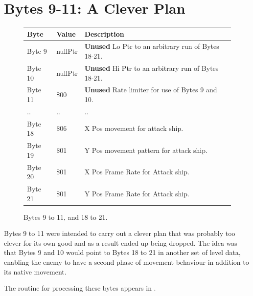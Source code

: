 \section{Bytes 9-11: A Clever Plan}
\begin{figure}[H]

  {
    \setlength{\tabcolsep}{3.0pt}
    \setlength\cmidrulewidth{\heavyrulewidth} %
    \begin{adjustbox}{width=13cm}

      \begin{tabular}{lll}
        \toprule
        Byte    & Value                     & Description                                                        \\
        \midrule
        Byte 9  & nullPtr                   & \textbf{Unused} Lo Ptr to an arbitrary run of Bytes 18-21.\\
        Byte 10 & nullPtr                   & \textbf{Unused} Hi Ptr to an arbitrary run of Bytes 18-21.\\
        Byte 11 & \$00                       & \textbf{Unused} Rate limiter for use of Bytes 9 and 10. \\
        .. & ..                       & ..\\
        Byte 18 & \$06                       & X Pos movement for attack ship.                                    \\
        Byte 19 & \$01                       & Y Pos movement pattern for attack ship.                            \\
        Byte 20 & \$01                       & X Pos Frame Rate for Attack ship.                                  \\
        Byte 21 & \$01                       & Y Pos Frame Rate for Attack ship.                                  \\
        \bottomrule
      \end{tabular}
    \end{adjustbox}
  }\caption*{Bytes 9 to 11, and 18 to 21.}
\end{figure}
Bytes 9 to 11 were intended to carry out a clever plan that was probably too clever for its own
good and as a result ended up being dropped. The idea was that Bytes 9 and 10 would point to 
Bytes 18 to 21 in another set of level data, enabling the enemy to have a second phase of movement
behaviour in addition to its native movement.

The routine for processing these bytes appears in . 

